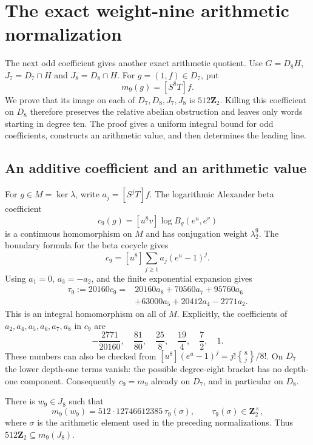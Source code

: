 \section{The exact weight-nine arithmetic normalization}
\label{sec:weight-nine-bounds}

The next odd coefficient gives another exact arithmetic quotient.
Use $G=D_8H$, $J_7=D_7\cap H$ and $J_8=D_8\cap H$.
For $g=(1,f)\in D_7$, put
\[
 m_9(g)=[S^8T]f.
\]
We prove that its image on each of $D_7,D_8,J_7,J_8$ is
$512\mathbf Z_2$. Killing this coefficient on $D_8$ therefore
preserves the relative abelian obstruction and leaves only words
starting in degree ten. The proof gives a uniform integral bound for odd coefficients,
constructs an arithmetic value, and then determines the leading line.



\subsection{An additive coefficient and an arithmetic value}

For $g\in M=\ker\lambda$, write $a_j=[S^jT]f$. The logarithmic
Alexander beta coefficient
\[
 c_9(g)=[u^8v]\log B_g(e^u,e^v)
\]
is a continuous homomorphism on $M$ and has conjugation weight
$\lambda_2^9$. The boundary formula for the beta cocycle gives
\[
 c_9=[u^8]\sum_{j\ge1}a_j(e^u-1)^j.
\]
Using $a_1=0$, $a_3=-a_2$, and the finite exponential expansion gives
\begin{equation}\label{eq:weight-nine-beta-formula}
 \begin{split}
 \tau_9:=20160c_9={}&20160a_8+70560a_7+95760a_6\\
                  &+63000a_5+20412a_4-2771a_2.
 \end{split}
\end{equation}
This is an integral homomorphism on all of $M$. Explicitly, the
coefficients of $a_2,a_4,a_5,a_6,a_7,a_8$ in $c_9$ are
\[
 -\frac{2771}{20160},\quad\frac{81}{80},\quad
 \frac{25}{8},\quad\frac{19}{4},\quad\frac72,\quad1.
\]
These numbers can also be checked from
$[u^8](e^u-1)^j=j!\genfrac{\{}{\}}{0pt}{}{8}{j}/8!$.
On $D_7$ the lower depth-one terms vanish: the possible degree-eight
bracket has no depth-one component. Consequently $c_9=m_9$ already
on $D_7$, and in particular on $D_8$.

\begin{proposition}\label{prop:weight-nine-arithmetic-value}
There is $w_9\in J_8$ such that
\[
 m_9(w_9)=512\cdot12746612385\,\tau_9(\sigma),
 \qquad \tau_9(\sigma)\in\mathbf Z_2^\times,
\]
where $\sigma$ is the arithmetic element used in the preceding
normalizations. Thus $512\mathbf Z_2\subseteq m_9(J_8)$.
\end{proposition}

